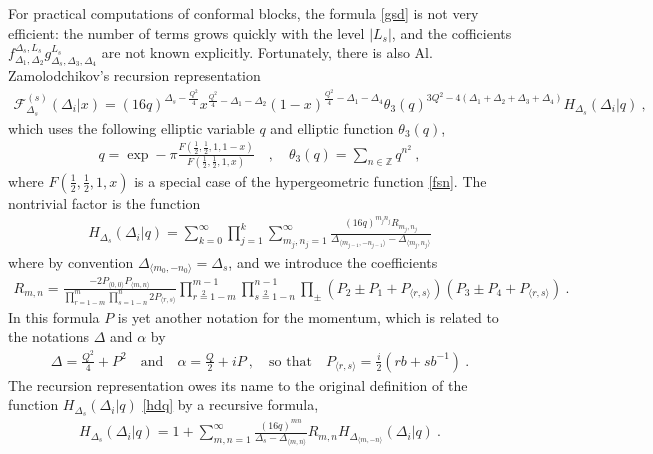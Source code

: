 \documentclass[12pt,a4paper,notitlepage]{report}
\numberwithin{equation}{section}
\theoremstyle{break}
\begin{document}
For practical computations of conformal blocks, the formula \eqref{gsd} is not very efficient: the number of terms grows quickly with the level $|L_s|$, and the cofficients $f_{\Delta_1,\Delta_2}^{\Delta_s,L_s} g^{L_s}_{\Delta_s,\Delta_3,\Delta_4}$ are not known explicitly.
Fortunately, there is also Al.
Zamolodchikov's recursion representation \cite{zz90}
\begin{align}
 \mathcal{F}^{(s)}_{\Delta_s}(\Delta_i|x) 
=  (16q)^{\Delta_s -\frac{Q^2}{4}} x^{\frac{Q^2}{4}-\Delta_1-\Delta_2} (1-x)^{\frac{Q^2}{4}-\Delta_1-\Delta_4} \theta_3(q)^{3Q^2-4(\Delta_1+\Delta_2+\Delta_3+\Delta_4)} H_{\Delta_s}(\Delta_i|q)\ ,
\end{align}
which uses the following elliptic variable $q$ and elliptic function $\theta_3(q)$,
\begin{align}
 q = \exp -\pi \frac{F(\frac12,\frac12,1,1-x)}{F(\frac12,\frac12,1,x)}  \quad , \quad \theta_3(q) = \sum_{n\in{\mathbb{Z}}} q^{n^2}\ ,
\end{align}
where $F(\frac12,\frac12,1,x)$ is a special case of the hypergeometric function \eqref{fsn}.
The nontrivial factor is the function
\begin{align}
 H_{\Delta_s}(\Delta_i|q) = \sum_{k=0}^\infty \prod_{j=1}^k \sum_{m_j,n_j=1}^\infty \frac{(16q)^{m_jn_j}R_{m_j,n_j}}{\Delta_{\langle m_{j-1},-n_{j-1} \rangle}-\Delta_{\langle m_j,n_j\rangle}}
\label{hdq}
\end{align}
where by convention $\Delta_{\langle m_0,-n_0\rangle} = \Delta_s$, and we introduce the coefficients
\begin{align}
 R_{m,n} = \frac{-2P_{\langle 0,0\rangle} P_{\langle m,n\rangle}}{\prod_{r=1-m}^m \prod_{s=1-n}^n 2P_{\langle r,s\rangle}}
\prod_{r\overset{2}{=}1-m}^{m-1} \prod_{s\overset{2}{=}1-n}^{n-1} \prod_\pm (P_2\pm P_1 + P_{\langle r,s\rangle}) (P_3\pm P_4 +P_{\langle r,s\rangle})\ .
\end{align}
In this formula $P$ is yet another notation for the momentum, which is related to the notations $\Delta$ and $\alpha$ by
\begin{align}
 \Delta = \frac{Q^2}{4} + P^2 \quad \text{and} \quad \alpha = \frac{Q}{2}+iP\ , \quad \text{so that} \quad P_{\langle r,s\rangle} = \frac{i}{2}\left(rb+sb^{-1}\right)\ .
\end{align}
The recursion representation owes its name to the original definition of the function $H_{\Delta_s}(\Delta_i|q)$ \eqref{hdq} by a recursive formula,
\begin{align}
 H_{\Delta_s}(\Delta_i|q) = 1 + \sum_{m,n=1}^\infty \frac{(16q)^{mn}}{\Delta_s-\Delta_{\langle m,n\rangle}} R_{m,n} H_{\Delta_{\langle m,-n\rangle}}(\Delta_i|q)\ .
\end{align}
\end{document}
